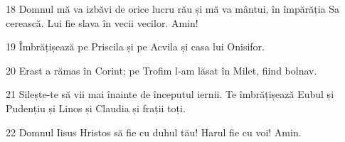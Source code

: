 \par 18 Domnul mă va izbăvi de orice lucru rău și mă va mântui, în împărăția Sa cerească. Lui fie slava în vecii vecilor. Amin!
\par 19 Îmbrățișează pe Priscila și pe Acvila și casa lui Onisifor.
\par 20 Erast a rămas în Corint; pe Trofim l-am lăsat în Milet, fiind bolnav.
\par 21 Silește-te să vii mai înainte de începutul iernii. Te îmbrățișează Eubul și Pudențiu și Linos și Claudia și frații toți.
\par 22 Domnul Iisus Hristos să fie cu duhul tău! Harul fie cu voi! Amin.


